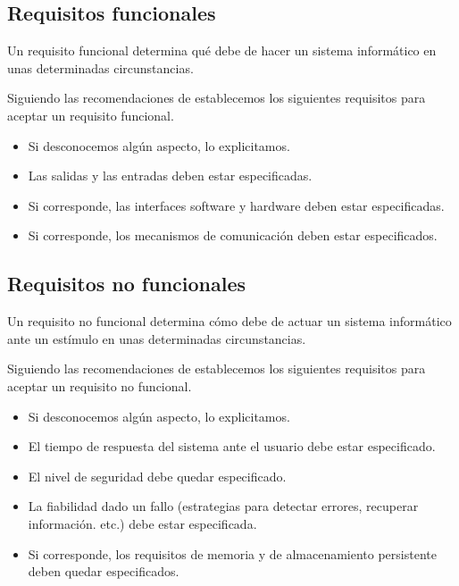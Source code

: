\subsection{Requisitos funcionales}

Un requisito funcional determina qué debe de hacer un sistema informático en unas determinadas circunstancias.

Siguiendo las recomendaciones de \cite[Checklist: Requirements]{CodeComplete2} establecemos
los siguientes requisitos para aceptar un requisito funcional.

\begin{itemize}
    \item Si desconocemos algún aspecto, lo explicitamos.
    \item Las salidas y las entradas deben estar especificadas.
    \item Si corresponde, las interfaces software y hardware deben
          estar especificadas.
    \item Si corresponde, los mecanismos de comunicación deben estar
          especificados.
\end{itemize}

\subsection{Requisitos no funcionales}

Un requisito no funcional determina cómo debe de actuar un sistema informático ante un estímulo en unas determinadas circunstancias.

Siguiendo las recomendaciones de \cite[Checklist: Requirements]{CodeComplete2} establecemos
los siguientes requisitos para aceptar un requisito no funcional. 

\begin{itemize}
    \item Si desconocemos algún aspecto, lo explicitamos.
    \item El tiempo de respuesta del sistema ante el usuario debe estar especificado.
    \item El nivel de seguridad debe quedar especificado.
    \item La fiabilidad dado un fallo (estrategias para detectar errores, recuperar información. etc.) debe estar especificada.
    \item Si corresponde, los requisitos de memoria y de almacenamiento persistente deben quedar especificados.
\end{itemize}

